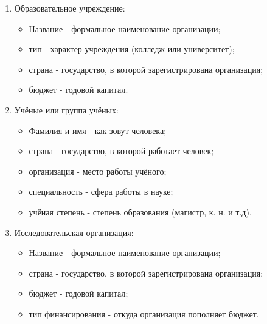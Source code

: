 \documentclass[14pt]{extreport}
\begin{document}
{\begin{enumerate}
        \item Образовательное учреждение:

        \begin{itemize}
            \item Название - формальное наименование организации;
        
            \item тип - характер учреждения (колледж или университет);
            
            \item страна - государство, в которой зарегистрирована организация;

            \item бюджет - годовой капитал.
        \end{itemize}

        \item Учёные или группа учёных:

        \begin{itemize}
            \item Фамилия и имя - как зовут человека;
        
            \item страна - государство, в которой работает человек;
            
            \item организация - место работы учёного;  
            
            \item специальность - сфера работы в науке;
            
            \item учёная степень - степень образования (магистр, к. н. и т.д).
        \end{itemize}

        

        \item Исследовательская организация:

        \begin{itemize}
            \item Название - формальное наименование организации;
        
            \item страна - государство, в которой зарегистрирована организация;

            \item бюджет - годовой капитал;
            
            \item тип финансирования - откуда организация пополняет бюджет.
        \end{itemize}


\end{enumerate}}
\end{document}
